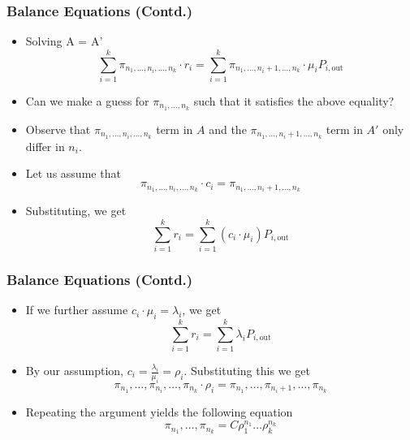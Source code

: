 \documentclass[10pt,notes]{beamer}
\begin{document}
\begin{frame}
    \frametitle{Balance Equations (Contd.)}
    \begin{itemize}
        \item Solving A = A'
            $$\sum_{i=1}^{k} \pi_{n_1,\ldots,n_i,\ldots,n_k} \cdot r_i = \sum_{i=1}^{k} \pi_{n_1,\ldots,n_i+1,\ldots,n_k} \cdot \mu_i P_{i,\text{out}}$$
        \item Can we make a guess for \(\pi_{n_1,\ldots,n_k}\) such that it satisfies the above equality?
        \item Observe that \(\pi_{n_1,\ldots,n_i,\ldots,n_k}\) term in $A$ and the \(\pi_{n_1,\ldots,n_i+1,\ldots,n_k}\) term in $A'$ only differ in $n_i$.
        \item Let us assume that
            $$\pi_{n_1,\ldots,n_i,\ldots,n_k} \cdot c_i = \pi_{n_1,\ldots,n_i+1,\ldots,n_k}$$
        \item Substituting, we get
            $$\sum_{i=1}^{k} r_i = \sum_{i=1}^{k} (c_i \cdot \mu_i) P_{i,\text{out}}$$
    \end{itemize}
\end{frame}

\begin{frame}
    \frametitle{Balance Equations (Contd.)}
    \begin{itemize}
        \item If we further assume $c_i \cdot \mu_i = \lambda_i$, we get $$\sum_{i=1}^{k} r_i = \sum_{i=1}^{k} \lambda_i P_{i,\text{out}}$$
        \item By our assumption, $c_i = \frac{\lambda_i}{\mu_i} = \rho_i$. Substituting this we get
            $$\pi_{n_1}, \ldots, \pi_{n_i}, \ldots, \pi_{n_k} \cdot \rho_i = \pi_{n_1}, \ldots, \pi_{n_i+1}, \ldots, \pi_{n_k}$$
        \item Repeating the argument yields the following equation
            $$\pi_{n_1}, \ldots, \pi_{n_k} = C \rho_{1}^{n_1} \ldots \rho_{k}^{n_k}$$
    \end{itemize}
\end{frame}
\end{document}
